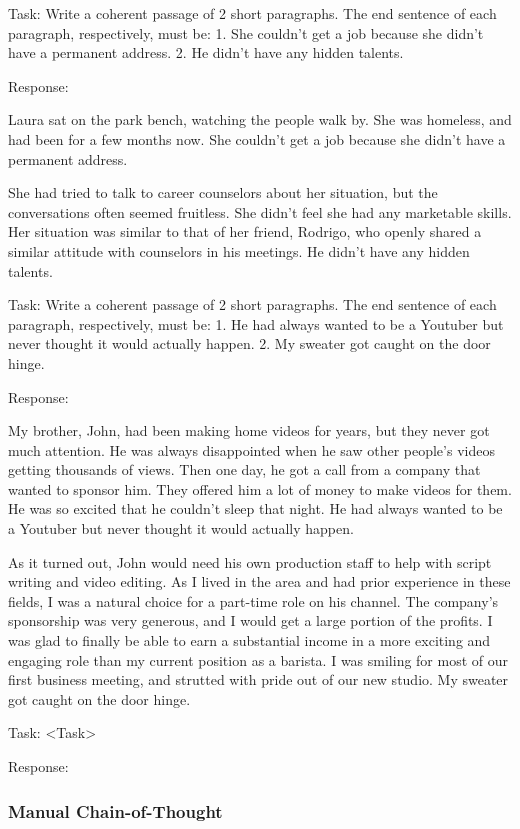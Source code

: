 \documentclass[11pt]{article}
\begin{document}
Task: Write a coherent passage of 2 short paragraphs. The end sentence of each paragraph, respectively, must be: 1. She couldn't get a job because she didn't have a permanent address. 2. He didn't have any hidden talents.

Response: 

Laura sat on the park bench, watching the people walk by. She was homeless, and had been for a few months now. She couldn't get a job because she didn't have a permanent address.

She had tried to talk to career counselors about her situation, but the conversations often seemed fruitless. She didn't feel she had any marketable skills. Her situation was similar to that of her friend, Rodrigo, who openly shared a similar attitude with counselors in his meetings. He didn't have any hidden talents.

Task: Write a coherent passage of 2 short paragraphs. The end sentence of each paragraph, respectively, must be: 1. He had always wanted to be a Youtuber but never thought it would actually happen. 2. My sweater got caught on the door hinge.

Response: 

My brother, John, had been making home videos for years, but they never got much attention. He was always disappointed when he saw other people's videos getting thousands of views. Then one day, he got a call from a company that wanted to sponsor him. They offered him a lot of money to make videos for them. He was so excited that he couldn't sleep that night. He had always wanted to be a Youtuber but never thought it would actually happen.

As it turned out, John would need his own production staff to help with script writing and video editing. As I lived in the area and had prior experience in these fields, I was a natural choice for a part-time role on his channel. The company's sponsorship was very generous, and I would get a large portion of the profits. I was glad to finally be able to earn a substantial income in a more exciting and engaging role than my current position as a barista. I was smiling for most of our first business meeting, and strutted with pride out of our new studio. My sweater got caught on the door hinge.

Task: <Task>

Response: 

\subsubsection*{Manual Chain-of-Thought}
\end{document}
